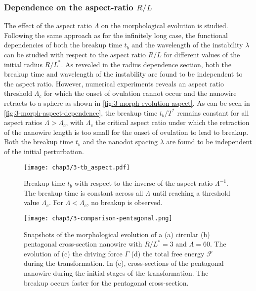 \subsubsection{Dependence on the aspect-ratio $R/L$}
The effect of the aspect ratio $\Lambda$ on the morphological evolution is studied. Following the same approach as for the infinitely long case, the functional dependencies of both the breakup time $t_b$ and the wavelength of the instability $\lambda$ can be studied with respect to the aspect ratio $R/L$ for different values of the initial radius $R/L^*$. As revealed in the radius dependence section, both the breakup time and wavelength of the instability are found to be independent to the aspect ratio. However, numerical experiments reveals an aspect ratio threshold $\Lambda_c$ for which the onset of ovulation cannot occur and the nanowire retracts to a sphere as shown in \autoref{fig:3-morph-evolution-aspect}.
As can be seen in \autoref{fig:3-morph-aspect-dependence}, the breakup time $t_b/T^*$ remains constant for all aspect ratios $\Lambda > \Lambda_c$, with $\Lambda_c$ the critical aspect ratio under which the retraction of the nanowire length is too small for the onset of ovulation to lead to breakup. Both the breakup time $t_b$ and the nanodot spacing $\lambda$ are found to be independent of the initial perturbation.
\begin{figure}[H]
    \centering
    \texttt{[image: chap3/3-tb\_aspect.pdf]}
    \caption{Breakup time $t_b$ with respect to the inverse of the aspect ratio $\Lambda^{-1}$. The breakup time is constant across all $\Lambda$ until reaching a threshold value $\Lambda_c$. For $\Lambda < \Lambda_c$, no breakup is observed.}
    \label{fig:3-morph-aspect-dependence}
\end{figure}
\begin{figure}[H]
    \centering
    \texttt{[image: chap3/3-comparison-pentagonal.png]}
    \caption{Snapshots of the morphological evolution of a (a) circular (b) pentagonal cross-section nanowire with $R/L^*=3$ and $\Lambda=60$. The evolution of (c) the driving force $\Gamma$ (d) the total free energy $\mathcal{F}$ during the transformation. In (e), cross-sections of the pentagonal nanowire during the initial stages of the transformation. The breakup occurs faster for the pentagonal cross-section.}
    \label{fig:3-shape-dependence-compare}
\end{figure}



